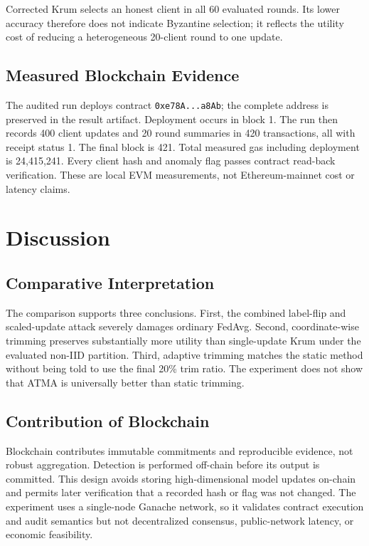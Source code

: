 \documentclass[10pt,letterpaper]{article}
\begin{document}
Corrected Krum selects an honest client in all 60 evaluated rounds. Its lower
accuracy therefore does not indicate Byzantine selection; it reflects the
utility cost of reducing a heterogeneous 20-client round to one update.

\subsection{Measured Blockchain Evidence}



The audited run deploys contract \texttt{0xe78A...a8Ab}; the complete address
is preserved in the result artifact. Deployment occurs in block 1.
The run then records 400 client updates and 20 round summaries in 420
transactions, all with receipt status 1. The final block is 421. Total measured
gas including deployment is 24,415,241. Every client hash and anomaly flag
passes contract read-back verification. These are local EVM measurements, not
Ethereum-mainnet cost or latency claims.

\section{Discussion}

\subsection{Comparative Interpretation}

The comparison supports three conclusions. First, the combined label-flip and
scaled-update attack severely damages ordinary FedAvg. Second, coordinate-wise
trimming preserves substantially more utility than single-update Krum under
the evaluated non-IID partition. Third, adaptive trimming matches the static
method without being told to use the final 20\% trim ratio. The experiment does
not show that ATMA is universally better than static trimming.

\subsection{Contribution of Blockchain}

Blockchain contributes immutable commitments and reproducible evidence, not
robust aggregation. Detection is performed off-chain before its output is
committed. This design avoids storing high-dimensional model updates on-chain
and permits later verification that a recorded hash or flag was not changed.
The experiment uses a single-node Ganache network, so it validates contract
execution and audit semantics but not decentralized consensus, public-network
latency, or economic feasibility.
\end{document}

